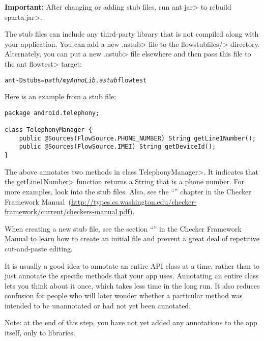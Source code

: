 \noindent
\textbf{Important:}
After changing or adding stub files, run \<ant jar> to rebuild \<sparta.jar>.



The stub files can include any third-party library that is not compiled
along with your application.  You can add a new \<.astub> file to the
\<flowstubfiles/> directory.
Alternately, you can put a new \<.astub> file elsewhere and then pass this
file to the \<ant flowtest> target:

\begin{alltt}
ant -Dstubs=\emph{path/myAnnoLib.astub} flowtest
\end{alltt}

Here is an example from a stub file:

\begin{Verbatim}
package android.telephony;

class TelephonyManager {
    public @Sources(FlowSource.PHONE_NUMBER) String getLine1Number();
    public @Sources(FlowSource.IMEI) String getDeviceId();
}
\end{Verbatim}

\noindent
The above annotates two methods in class \<TelephonyManager>.
It indicates that the \<getLine1Number> function returns a String that is a
phone number.  For more examples, look into the stub files. Also, see 
the
``'' chapter in the Checker Framework Manual\ifhevea\else\ (\url{http://types.cs.washington.edu/checker-framework/current/checkers-manual.pdf})\fi.


When creating a new stub file, see the section
``'' in the Checker Framework Manual to learn how to create an
initial file and prevent a great deal of repetitive cut-and-paste editing.


It is usually a good idea to annotate an entire API class at a time, rather
than to just annotate the specific methods that your app uses.  Annotating
an entire class lets you think about it once, which takes less time in the
long run.  It also reduces confusion for people who will later wonder
whether a particular method was intended to be unannotated or had not yet
been annotated.


Note: at the end of this step, you have not yet added any annotations to
the app itself, only to libraries.


